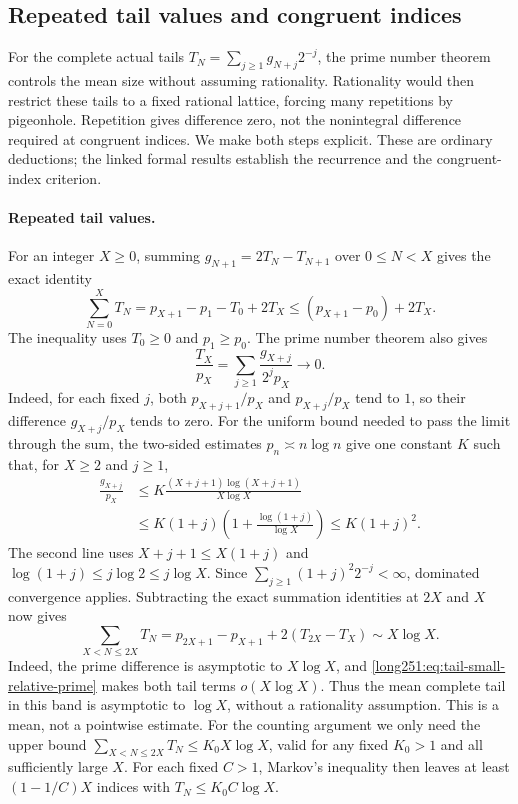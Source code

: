 \documentclass[11pt]{article}
\begin{document}
\subsection{Repeated tail values and congruent indices}
\label{long251:sec:xr-compression}

For the complete actual tails $T_N=\sum_{j\ge1}g_{N+j}2^{-j}$, the prime
number theorem controls the mean size without assuming rationality.
Rationality would then restrict these tails to a fixed rational lattice,
forcing many repetitions by pigeonhole.  Repetition gives difference zero,
not the nonintegral difference required at congruent indices.  We make
both steps explicit.  These are ordinary deductions; the linked formal
results establish the recurrence and the congruent-index criterion.

\paragraph{Repeated tail values.}
For an integer $X\ge0$, summing $g_{N+1}=2T_N-T_{N+1}$ over
$0\le N<X$ gives the exact identity
\[
 \sum_{N=0}^{X}T_N=p_{X+1}-p_1-T_0+2T_X
 \le(p_{X+1}-p_0)+2T_X.
\]
The inequality uses $T_0\ge0$ and $p_1\ge p_0$.  The prime number theorem
\cite[Ch.~6]{mv2007} also gives
\begin{equation}\label{long251:eq:tail-small-relative-prime}
 \frac{T_X}{p_X}
 =\sum_{j\ge1}\frac{g_{X+j}}{2^jp_X}\longrightarrow0.
\end{equation}
Indeed, for each fixed $j$, both $p_{X+j+1}/p_X$ and $p_{X+j}/p_X$
tend to $1$, so their difference $g_{X+j}/p_X$ tends to zero.
For the uniform bound needed to pass the limit through the sum, the
two-sided estimates $p_n\asymp n\log n$ give one constant $K$ such that,
for $X\ge2$ and $j\ge1$,
\[
 \begin{aligned}
 \frac{g_{X+j}}{p_X}
 &\le K\frac{(X+j+1)\log(X+j+1)}{X\log X}\\
 &\le K(1+j)\left(1+\frac{\log(1+j)}{\log X}\right)
 \le K(1+j)^2.
 \end{aligned}
\]
The second line uses $X+j+1\le X(1+j)$ and
$\log(1+j)\le j\log2\le j\log X$.
Since $\sum_{j\ge1}(1+j)^2 2^{-j}<\infty$, dominated convergence applies.
Subtracting the exact summation identities at $2X$ and $X$ now gives
\[
 \sum_{X<N\le2X}T_N
 =p_{2X+1}-p_{X+1}+2(T_{2X}-T_X)
 \sim X\log X.
\]
Indeed, the prime difference is asymptotic to $X\log X$, and
\eqref{long251:eq:tail-small-relative-prime} makes both tail terms
$o(X\log X)$.  Thus the mean complete tail in this band is asymptotic
to $\log X$, without a rationality assumption.  This is a mean, not a
pointwise estimate.  For the counting argument we only need the upper
bound $\sum_{X<N\le2X}T_N\le K_0X\log X$, valid for any fixed $K_0>1$
and all sufficiently large $X$.  For each fixed $C>1$, Markov's inequality
then leaves at least $(1-1/C)X$ indices with $T_N\le K_0C\log X$.
\end{document}
